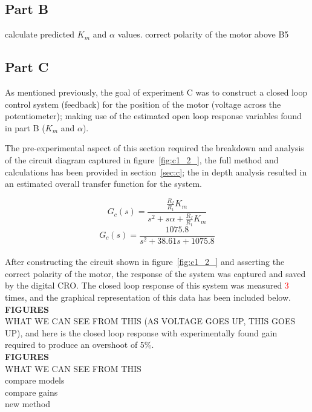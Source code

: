 \documentclass[11pt,a4paper]{article}
\begin{document}
\subsection{Part B}
calculate predicted $K_m$ and $\alpha$ values.
correct polarity of the motor
above
B5








\pagebreak
\subsection{Part C}
As mentioned previously, the goal of experiment C was to construct a closed loop control system (feedback) for the position of the motor (voltage across the potentiometer); making use of the estimated open loop response variables found in part B ($K_m$ and $\alpha$). 

The pre-experimental aspect of this section required the breakdown and analysis of the circuit diagram captured in figure~\ref{fig:c1_2_}, the full method and calculations has been provided in section~\ref{sec:c}; the in depth analysis resulted in an estimated overall transfer function for the system. 

$$ G_c(s) = \frac{\frac{R_f}{R_1}K_m} {s^2 + s\alpha + \frac{R_f}{R_1}K_m} $$
$$ G_c(s) = \frac{1075.8} {s^2 + 38.61s + 1075.8} $$\\


After constructing the circuit shown in figure~\ref{fig:c1_2_} and asserting the correct polarity of the motor, the response of the system was captured and saved by the digital CRO. The closed loop response of this system was measured \textcolor{red}{3} times, and the graphical representation of this data has been included below.\\

\textbf{FIGURES}\\

WHAT WE CAN SEE FROM THIS (AS VOLTAGE GOES UP, THIS GOES UP), and here is the closed loop response with experimentally found gain required to produce an overshoot of 5\%.\\

\textbf{FIGURES}\\

WHAT WE CAN SEE FROM THIS\\

compare models\\
compare gains\\
new method\\
\end{document}
